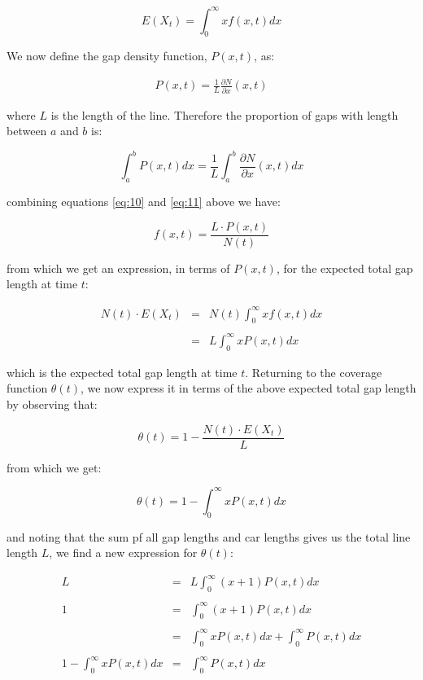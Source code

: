 \[
	E(X_t) = \int_{0}^{\infty} x f(x, t) dx
\]\medskip

We now define the gap density function, $P(x, t)$, as: \bigskip

\begin{eqnarray} \label{eq:11}
	P(x, t) = \frac{1}{L} \frac{\partial N}{\partial x} (x, t)
\end{eqnarray}\medskip

where $L$ is the length of the line. Therefore the proportion of gaps with length between 
$a$ and $b$ is: \bigskip

\[
	\int_{a}^{b} P(x, t) dx = \frac{1}{L} \int_{a}^{b} \frac{\partial N}{\partial x} (x, t) dx
\]\medskip

combining equations \ref{eq:10} and \ref{eq:11} above we have: \bigskip

\[
	f(x, t) = \frac{L \cdot P(x, t)}{N(t)}
\]\medskip

from which we get an expression, in terms of $P(x, t)$, for the expected total gap length 
at time $t$: \bigskip

\begin{eqnarray*}
	N(t) \cdot E(X_t) & = & N(t) \int_{0}^{\infty} x f(x, t) dx \\\\
					  & = & L \int_{0}^{\infty} x P(x, t) dx
\end{eqnarray*}\medskip

which is the expected total gap length at time $t$. Returning to the coverage function 
$\theta(t)$, we now express it in terms of the above expected total gap length by observing 
that: \bigskip

\[
	\theta(t) = 1 - \frac{N(t) \cdot E(X_t)}{L}
\]\medskip

from which we get: \bigskip

\[
	\theta(t) = 1 - \int_{0}^{\infty} x P(x, t) dx
\]\medskip

and noting that the sum pf all gap lengths and car lengths gives us the total line length 
$L$, we find a new expression for $\theta(t)$: \bigskip

\begin{eqnarray*}
									 L & = & L \int_{0}^{\infty} (x + 1) P(x, t) dx \\\\
									 1 & = & \int_{0}^{\infty} (x + 1) P(x, t) dx \\\\
									   & = & \int_{0}^{\infty} x P(x, t) dx + \int_{0}^{\infty} P(x, t) dx \\\\
	1 - \int_{0}^{\infty} x P(x, t) dx & = & \int_{0}^{\infty} P(x, t) dx
\end{eqnarray*}\medskip

